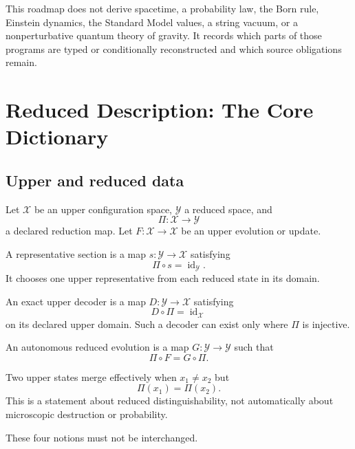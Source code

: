 \documentclass[11pt]{article}
\begin{document}
This roadmap does not derive spacetime, a probability law, the Born rule,
Einstein dynamics, the Standard Model values, a string vacuum, or a
nonperturbative quantum theory of gravity.  It records which parts of those
programs are typed or conditionally reconstructed and which source obligations
remain.

\section{Reduced Description: The Core Dictionary}

\subsection{Upper and reduced data}

Let $\mathcal X$ be an upper configuration space, $\mathcal Y$ a reduced
space, and
\[
\Pi:\mathcal X\longrightarrow\mathcal Y
\]
a declared reduction map.  Let $F:\mathcal X\to\mathcal X$ be an upper
evolution or update.

\begin{definition}
A representative section is a map $s:\mathcal Y\to\mathcal X$ satisfying
\[
\Pi\circ s=\operatorname{id}_{\mathcal Y}.
\]
It chooses one upper representative from each reduced state in its domain.
\end{definition}

\begin{definition}
An exact upper decoder is a map $D:\mathcal Y\to\mathcal X$ satisfying
\[
D\circ\Pi=\operatorname{id}_{\mathcal X}
\]
on its declared upper domain.  Such a decoder can exist only where $\Pi$ is
injective.
\end{definition}

\begin{definition}
An autonomous reduced evolution is a map $G:\mathcal Y\to\mathcal Y$ such that
\[
\Pi\circ F=G\circ\Pi.
\]
\end{definition}

\begin{definition}
Two upper states merge effectively when $x_1\ne x_2$ but
\[
\Pi(x_1)=\Pi(x_2).
\]
This is a statement about reduced distinguishability, not automatically about
microscopic destruction or probability.
\end{definition}

These four notions must not be interchanged.
\end{document}
